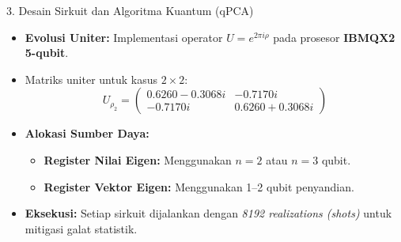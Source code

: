 \begin{frame}{3. Desain Sirkuit dan Algoritma Kuantum (qPCA)}
    \begin{itemize}
        \item \textbf{Evolusi Uniter:} Implementasi operator $U = e^{2\pi i \rho}$ pada prosesor \textbf{IBMQX2 5-qubit}.
        \item Matriks uniter untuk kasus $2 \times 2$:
        \begin{equation}
            U_{\rho_2} = \begin{pmatrix} 0.6260 - 0.3068i & -0.7170i \\ -0.7170i & 0.6260 + 0.3068i \end{pmatrix}
        \end{equation}
        \item \textbf{Alokasi Sumber Daya:}
        \begin{itemize}
            \item \textbf{Register Nilai Eigen:} Menggunakan $n=2$ atau $n=3$ qubit.
            \item \textbf{Register Vektor Eigen:} Menggunakan 1--2 qubit penyandian.
        \end{itemize}
        \item \textbf{Eksekusi:} Setiap sirkuit dijalankan dengan \textit{8192 realizations (shots)} untuk mitigasi galat statistik.
    \end{itemize}
\end{frame}
